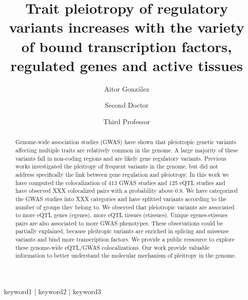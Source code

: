 
\title{Trait pleiotropy of regulatory variants increases with the variety of bound transcription factors, regulated genes and active tissues}

\author[1,\Letter]{Aitor González }
\author[2]{Second Doctor }
\author[1]{Third Professor }
\date{}

\maketitle

\begin{abstract}
Genome-wide association studies (GWAS) have shown that pleiotropic genetic variants affecting multiple traits are relatively common in the genome.
A large majority of these variants fall in non-coding regions and are likely gene regulatory variants.
Previous works investigated the pleitropy of frequent variants in the genome, but did not address specifically the link between gene regulation and pleiotropy.
%
In this work we have computed the colocalization of 413 GWAS studies and 125 eQTL studies and have observed XXX colocalized pairs with a probability above 0.8.
We have categorized the GWAS studies into XXX categories and have splitted variants according to the number of groups they belong to.
We observed that pleiotropic variants are associated to more eQTL genes (egenes), more eQTL tissues (etissues).
Unique egenes-etissues pairs are also associated to more GWAS phenotypes.
These observations could be partially explained, because pleitropic variants are enriched in splicing and missense variants and bind more transcription factors.
We provide a public ressource to explore these genome-wide eQTL/GWAS colocalizations.
%
Our work provide valuable information to better understand the molecular mechanism of pleitropy in the genome.


\lipsum[1][1]
\end{abstract}

\begin{keywords}
keyword1 | keyword2 | keyword3
\end{keywords}

\begin{corrauthor}
\end{corrauthor}


